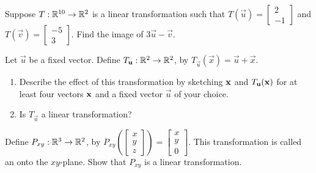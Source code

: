 \documentclass{ximera}
\begin{document}
\begin{problem}\label{prob:imageoflincomb}
Suppose $T:\RR^{10}\rightarrow\RR^2$ is a linear transformation such that $T(\vec{u})=\begin{bmatrix}2\\-1\end{bmatrix}$ and $T(\vec{v})=\begin{bmatrix}-5\\3\end{bmatrix}$.  Find the image of $3\vec{u}-\vec{v}$.
\end{problem}


\begin{problem}\label{prob:notlinear} 
Let $\vec{u}$ be a fixed vector.  Define $T_{\vec{u}}:\RR^2\rightarrow\RR^2$, by $T_{\vec{u}}(\vec{x})=\vec{u}+\vec{x}$.
  \begin{enumerate}
  \item 
  Describe the effect of this transformation by sketching ${\bf x}$ and $T_{\vec{u}}({\bf x})$ for at least four vectors ${\bf x}$ and a fixed vector $\vec{u}$ of your choice.
  \item 
  Is $T_{\vec{u}}$ a linear transformation?
  \end{enumerate}
\end{problem}

\begin{problem}\label{prob:projectiontrans}
Define $P_{xy}:\RR^3\rightarrow\RR^2$, by $P_{xy}\left(\begin{bmatrix}
x\\
y\\
z
\end{bmatrix} \right)=\begin{bmatrix}
x\\
y\\
0
\end{bmatrix}$.  This transformation is called an  onto the $xy$-plane.  Show that $P_{xy}$ is a linear transformation.
\end{problem}
\end{document}
